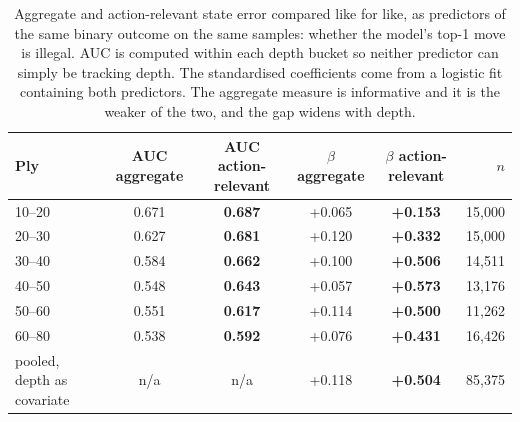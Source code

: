 \begin{table}[t]
\centering\small
\caption{Aggregate and action-relevant state error compared like for
like, as predictors of the same binary outcome on the same samples:
whether the model's top-1 move is illegal. AUC is computed within each
depth bucket so neither predictor can simply be tracking depth. The
standardised coefficients come from a logistic fit containing both
predictors. The aggregate measure is informative and it is the weaker of
the two, and the gap widens with depth.}
\label{tab:auc}
\begin{tabular}{lccccr}
\toprule
Ply & AUC aggregate & AUC action-relevant & $\beta$ aggregate & $\beta$ action-relevant & $n$ \\
\midrule
10--20 & 0.671 & \textbf{0.687} & +0.065 & \textbf{+0.153} & 15{,}000 \\
20--30 & 0.627 & \textbf{0.681} & +0.120 & \textbf{+0.332} & 15{,}000 \\
30--40 & 0.584 & \textbf{0.662} & +0.100 & \textbf{+0.506} & 14{,}511 \\
40--50 & 0.548 & \textbf{0.643} & +0.057 & \textbf{+0.573} & 13{,}176 \\
50--60 & 0.551 & \textbf{0.617} & +0.114 & \textbf{+0.500} & 11{,}262 \\
60--80 & 0.538 & \textbf{0.592} & +0.076 & \textbf{+0.431} & 16{,}426 \\
\midrule
pooled, depth as covariate & n/a & n/a & +0.118 & \textbf{+0.504} & 85{,}375 \\
\bottomrule
\end{tabular}
\end{table}

